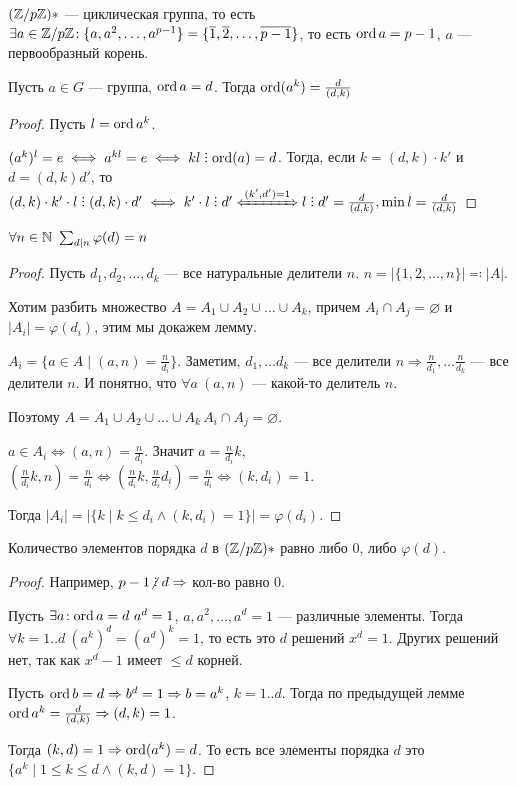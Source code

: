 \begin{theorem}
    $(\mathbb{Z} / p \mathbb{Z})*$ --- циклическая группа, то  есть  $\exists a \in \mathbb{Z} / p \mathbb{Z}\!: \{a, a^2,\ldots,a^{p-1}\} = \{\overline{1}, \overline{2},\ldots, \overline{p-1}\}$, то есть $\operatorname{ord} a = p - 1$,  $a$ --- первообразный корень.
\end{theorem}
\begin{lemma}
    Пусть $a \in G$ --- группа,  $\operatorname{ord} a = d$. Тогда  $\operatorname{ord}(a^k) = \frac{d}{(d, k)}$
\end{lemma}
\begin{proof}
    Пусть $l = \operatorname{ord} a^k$.

	$(a^k)^l = e \iff a^{kl} = e \iff kl \divby \ord(a) = d$. Тогда, если $k = (d, k) \cdot k'$  и  $d = (d, k) d'$, то  $(d, k) \cdot k' \cdot l \divby (d, k) \cdot d' \iff k' \cdot l \divby d' \xLeftrightarrow{(k', d') = 1} l \divby d' = \frac{d}{(d, k)}, \min l = \frac{d}{(d, k)}$ 
\end{proof}
\begin{lemma}
    $\forall n \in \mathbb{N}\ \sum_{d \mid n} \varphi(d) = n$
\end{lemma}
\begin{proof}
    Пусть $d_1, d_2, \ldots, d_k$ --- все натуральные делители $n$.  $n = |\{1, 2, \ldots, n\}| \eqqcolon |A|$.

    Хотим разбить множество $A = A_1 \cup A_2 \cup \ldots \cup A_k$, причем $A_i \cap A_j = \varnothing$ и  $|A_i| = \varphi(d_i)$, этим мы докажем лемму.

    $A_i = \{ a \in A \mid (a, n) = \frac{n}{d_i}\}$. Заметим, $d_1, \ldots d_k$ --- все делители $n \Rightarrow \frac{n}{d_1}, \ldots \frac{n}{d_k}$ --- все делители $n$. И понятно, что  $\forall a\ (a, n)$ --- какой-то делитель  $n$. 

     Поэтому $A = A_1 \cup A_2 \cup \ldots \cup A_k\, A_i \cap A_j = \varnothing$.

     $a \in A_i \iff (a, n) = \frac{n}{d_i}$. Значит $a = \frac{n}{d_i}k$, $(\frac{n}{d_i}k, n) = \frac{n}{d_i} \iff (\frac{n}{d_i}k, \frac{n}{d_i}d_i) = \frac{n}{d_i} \iff (k, d_i) = 1$. 

     Тогда $|A_i| = |\{ k \mid k \le d_i \land (k, d_i) = 1\}| = \varphi(d_i)$.
\end{proof}
\begin{lemma}
    Количество элементов порядка $d$ в  $(\mathbb{Z} / p \mathbb{Z})*$ равно либо 0, либо  $\varphi(d)$. 
\end{lemma}
\begin{proof}
    Например, $p-1 \centernot \divby d \Rightarrow $ кол-во равно  $0$. 

    Пусть  $\exists a\!: \operatorname{ord} a = d\ a^d = 1$, $a, a^2, \ldots, a^d = 1$ --- различные элементы. Тогда $\forall k=1..d\ (a^k)^d = (a^d)^k = 1$, то есть это  $d$ решений  $x^d = 1$. Других решений нет, так как  $x^d - 1$ имеет  $\le d$ корней.

    Пусть $\operatorname{ord} b = d \Rightarrow b^d = 1 \Rightarrow b = a^k$,  $k = 1..d$. Тогда по предыдущей лемме  $\operatorname{ord} a^k = \frac{d}{(d, k)} \Rightarrow (d, k) = 1$. 

    Тогда $(k, d)= 1 \Rightarrow \operatorname{ord}(a^k) = d$. То есть все элементы порядка  $d$ это  $\{a^k \mid 1 \le k \le d \land (k, d) = 1 \}$.
\end{proof}
